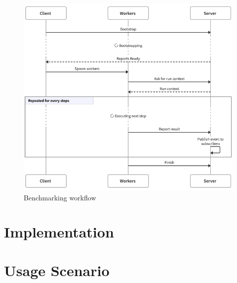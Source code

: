\begin{figure}
    \centering
    \includegraphics[width=\textwidth]{assets/pics/workflow-swimlane.png}
    \caption{Benchmarking workflow}
\end{figure}

\section{Implementation}
\section{Usage Scenario}
